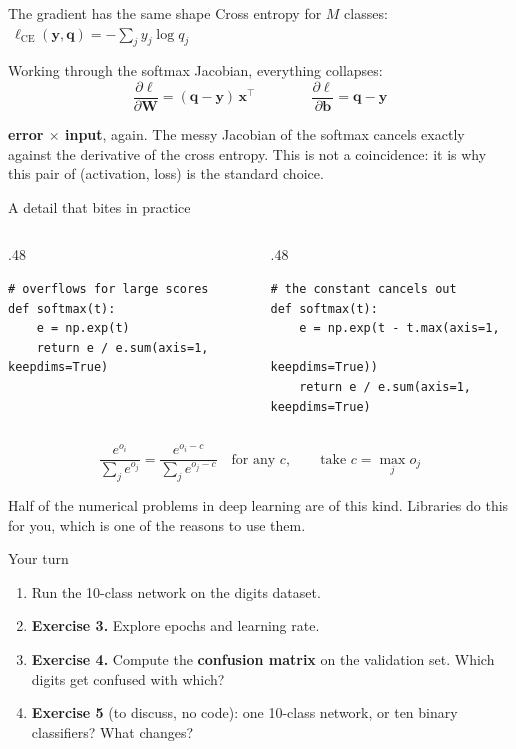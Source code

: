 \documentclass[aspectratio=169,10pt]{beamer}
\newcommand{\vx}{{\bm x}}
\newcommand{\vy}{{\bm y}}
\newcommand{\vW}{{\bm W}}
\newcommand{\vb}{{\bm b}}
\newcommand{\vq}{{\bm q}}
\begin{document}
\begin{frame}{The gradient has the same shape}
Cross entropy for $M$ classes: $\ \ell_\text{CE}(\vy,\vq) = -\sum_j y_j \log q_j$

\medskip
Working through the softmax Jacobian, everything collapses:
$$\frac{\partial \ell}{\partial \vW} = (\vq - \vy)\,\vx^\intercal
\qquad\qquad
\frac{\partial \ell}{\partial \vb} = \vq - \vy$$

\begin{keybox}
\textbf{error $\times$ input}, again. The messy Jacobian of the softmax cancels exactly
against the derivative of the cross entropy. This is not a coincidence: it is why this
pair of (activation, loss) is the standard choice.
\end{keybox}
\end{frame}

\begin{frame}[fragile]{A detail that bites in practice}
\begin{columns}[T]
\begin{column}{.48\textwidth}
\begin{lstlisting}
# overflows for large scores
def softmax(t):
    e = np.exp(t)
    return e / e.sum(axis=1, keepdims=True)
\end{lstlisting}
\end{column}
\begin{column}{.48\textwidth}
\begin{lstlisting}
# the constant cancels out
def softmax(t):
    e = np.exp(t - t.max(axis=1,
                         keepdims=True))
    return e / e.sum(axis=1, keepdims=True)
\end{lstlisting}
\end{column}
\end{columns}
\vspace{.6em}
$$\frac{e^{o_i}}{\sum_j e^{o_j}} = \frac{e^{o_i - c}}{\sum_j e^{o_j - c}}
  \quad \text{for any } c, \qquad \text{take } c = \max_j o_j$$
\begin{center}\small
Half of the numerical problems in deep learning are of this kind. Libraries do this for
you, which is one of the reasons to use them.
\end{center}
\end{frame}

\begin{frame}{Your turn}
\begin{practice}
\begin{enumerate}
  \item Run the 10-class network on the digits dataset.
  \item \textbf{Exercise 3.} Explore epochs and learning rate.
  \item \textbf{Exercise 4.} Compute the \textbf{confusion matrix} on the validation set.
        Which digits get confused with which?
  \item \textbf{Exercise 5} (to discuss, no code): one 10-class network, or ten binary
        classifiers? What changes?
\end{enumerate}
\end{practice}
\end{frame}
\end{document}
